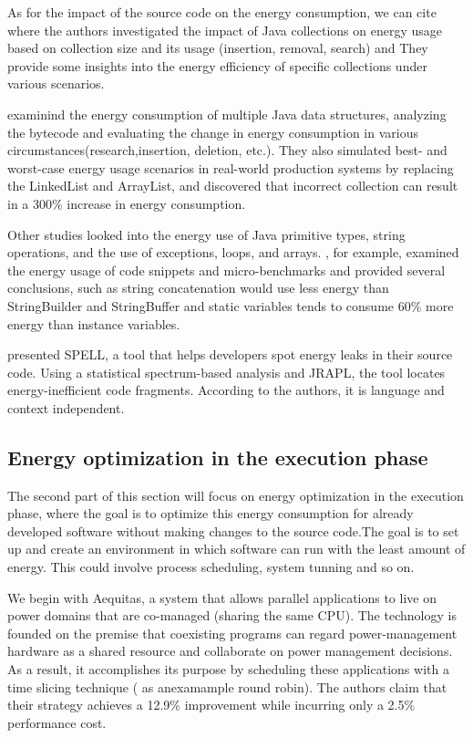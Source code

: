 As for the impact of the source code on the energy consumption, we can cite~\cite{pinto_comprehensive_2016,fernandes_assisting_2017} where the authors investigated the impact of Java collections on energy usage based on collection size and its usage (insertion, removal, search) and They provide some insights into the energy efficiency of specific collections under various scenarios.

\citeauthor{hasan_energy_2016} examinind the energy consumption of multiple Java data structures, analyzing the bytecode and evaluating the change in energy consumption in various circumstances(research,insertion, deletion, etc.). They also simulated best- and worst-case energy usage scenarios in real-world production systems by replacing the LinkedList and ArrayList, and discovered that incorrect collection can result in a 300\% increase in energy consumption\cite{hasan_energy_2016}.

Other studies\cite{longo_reducing_2019,kumar_energy_2017} looked into the energy use of Java primitive types, string operations, and the use of exceptions, loops, and arrays. \citeauthor{kumar_energy_2017}, for example, examined the energy usage of code snippets and micro-benchmarks and provided several conclusions, such as string concatenation would use less energy than StringBuilder and StringBuffer and static variables tends to consume 60\% more energy than instance variables.

\citeauthor{pereira_helping_2017} \cite{pereira_helping_2017} presented SPELL, a tool that helps developers spot energy leaks in their source code. Using a statistical spectrum-based analysis and JRAPL\cite{guimaraes2016some,liu_data-oriented_2015}, the tool locates energy-inefficient code fragments. According to the authors, it is language and context independent.

\subsection{Energy optimization in the execution phase}

The second part of this section will focus on energy optimization in the execution phase, where the goal is to optimize this energy consumption for already developed software without making changes to the source code.The goal is to set up and create an environment in which software can run with the least amount of energy. This could involve process scheduling, system tunning and so on.

We begin with Aequitas\cite{ribic2016aequitas}, a system that allows parallel applications to live on power domains that are co-managed (sharing the same CPU). The technology is founded on the premise that coexisting programs can regard power-management hardware as a shared resource and collaborate on power management decisions. As a result, it accomplishes its purpose by scheduling these applications with a time slicing technique ( as anexamample round robin). The authors claim that their strategy achieves a 12.9\% improvement while incurring only a 2.5\% performance cost.

